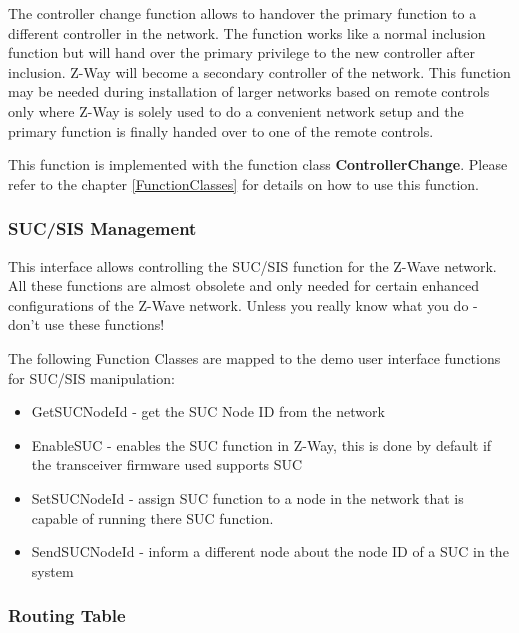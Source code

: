 The controller change function allows to handover the primary function to a different controller in the network. The function works like a normal inclusion 
function but will hand over the primary privilege to the new controller after inclusion. Z-Way will become a secondary controller of the network.
This function may be needed during installation of larger networks based on remote controls only where Z-Way is solely used to do a convenient network 
setup and the primary function is finally handed over to one of the remote controls.

This function is implemented with the function class {\bf ControllerChange}. Please refer to the chapter \ref{FunctionClasses} for details on how to use this function.

\subsubsection {SUC/SIS Management}

This interface allows controlling the SUC/SIS function for the Z-Wave network. All these functions are almost obsolete and only needed for certain enhanced configurations of the Z-Wave network. Unless you really know what you do - don't use these functions!

The following Function Classes are mapped to the demo user interface  functions for SUC/SIS manipulation:
\begin{itemize}
\item GetSUCNodeId - get the SUC Node ID from the network
\item EnableSUC - enables the SUC function in Z-Way, this is done by default if the transceiver firmware used supports SUC
\item SetSUCNodeId - assign SUC function to a node in the network that is capable of running there SUC function.
\item SendSUCNodeId - inform a different node about the node ID of a SUC in the system
\end{itemize}


 
\subsubsection{Routing Table}


